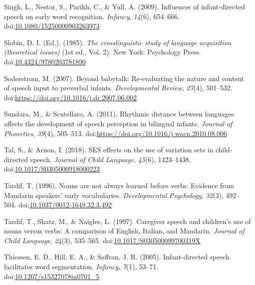 \documentclass[,man,floatsintext]{apa6}
\begin{document}
\leavevmode\hypertarget{ref-singh_2009}{}%
Singh, L., Nestor, S., Parikh, C., \& Yull, A. (2009). Influences of infant-directed speech on early word recognition. \emph{Infancy}, \emph{14}(6), 654--666. doi:\href{https://doi.org/10.1080/15250000903263973}{10.1080/15250000903263973}

\leavevmode\hypertarget{ref-slobin_1985}{}%
Slobin, D. I. (Ed.). (1985). \emph{The crosslinguistic study of language acquisition (theoretical issues)} (1st ed., Vol. 2). New York: Psychology Press. doi:\href{https://doi.org/10.4324/9780203781890}{10.4324/9780203781890}

\leavevmode\hypertarget{ref-soderstrom_2007}{}%
Soderstrom, M. (2007). Beyond babytalk: Re-evaluating the nature and content of speech input to preverbal infants. \emph{Developmental Review}, \emph{27}(4), 501--532. doi:\href{https://doi.org/https://doi.org/10.1016/j.dr.2007.06.002}{https://doi.org/10.1016/j.dr.2007.06.002}

\leavevmode\hypertarget{ref-sundara_2011}{}%
Sundara, M., \& Scutellaro, A. (2011). Rhythmic distance between languages affects the development of speech perception in bilingual infants. \emph{Journal of Phonetics}, \emph{39}(4), 505--513. doi:\href{https://doi.org/https://doi.org/10.1016/j.wocn.2010.08.006}{https://doi.org/10.1016/j.wocn.2010.08.006}

\leavevmode\hypertarget{ref-tal_2018}{}%
Tal, S., \& Arnon, I. (2018). SES effects on the use of variation sets in child-directed speech. \emph{Journal of Child Language}, \emph{45}(6), 1423--1438. doi:\href{https://doi.org/10.1017/S0305000918000223}{10.1017/S0305000918000223}

\leavevmode\hypertarget{ref-tardif_1996}{}%
Tardif, T. (1996). Nouns are not always learned before verbs: Evidence from Mandarin speakers' early vocabularies. \emph{Developmental Psychology}, \emph{32}(3), 492--504. doi:\href{https://doi.org/10.1037/0012-1649.32.3.492}{10.1037/0012-1649.32.3.492}

\leavevmode\hypertarget{ref-tardif_1997}{}%
Tardif, T., Shatz, M., \& Naigles, L. (1997). Caregiver speech and children's use of nouns versus verbs: A comparison of English, Italian, and Mandarin. \emph{Journal of Child Language}, \emph{24}(3), 535--565. doi:\href{https://doi.org/10.1017/S030500099700319X}{10.1017/S030500099700319X}

\leavevmode\hypertarget{ref-thiessen_2005}{}%
Thiessen, E. D., Hill, E. A., \& Saffran, J. R. (2005). Infant-directed speech facilitates word segmentation. \emph{Infancy}, \emph{7}(1), 53--71. doi:\href{https://doi.org/10.1207/s15327078in0701_5}{10.1207/s15327078in0701\_5}
\end{document}
